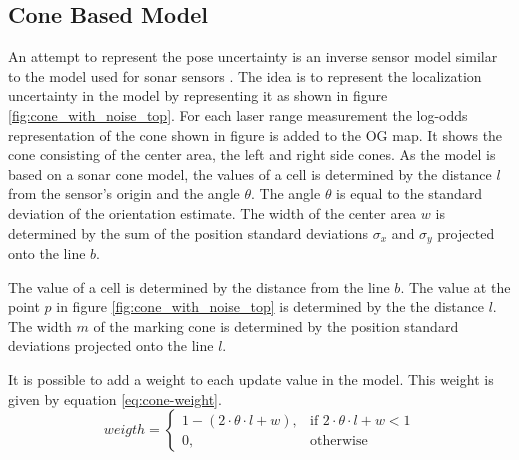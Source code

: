 \subsection{Cone Based Model}
An attempt to represent the pose uncertainty is an inverse sensor model similar to the model used for sonar sensors  \cite{probRob}.  
The idea is to represent the localization uncertainty in the model by representing it as shown in figure \vref{fig:cone_with_noise_top}.
For each laser range measurement the log-odds representation of the cone shown in figure is added to the OG map.
It shows the cone consisting of the center area, the left and right side cones. 
As the model is based on a sonar cone model, the values of a cell is determined by the distance \(l\) from the sensor's origin and the angle \(\theta\). 
The angle \(\theta\) is equal to the standard deviation of the orientation estimate. 
The width of the center area $w$ is determined by the sum of the position standard deviations $\sigma_x$ and $\sigma_y$ projected onto the line $b$. 

The value of a cell is determined by the distance from the line $b$. 
The value at the point $p$ in figure \vref{fig:cone_with_noise_top} is determined by the the distance \(l\).
The width $m$ of the marking cone is determined by the position standard deviations projected onto the line $l$.

It is possible to add a weight to each update value in the model. This weight is given by equation \vref{eq:cone-weight}.
\begin{equation}
\label{eq:cone-weight}
weigth = 
\begin{cases}
1 - ( 2 \cdot \theta \cdot l + w), & \text{if } 2 \cdot \theta \cdot l + w < 1\\
0, & \text{otherwise}
\end{cases}
\end{equation}

